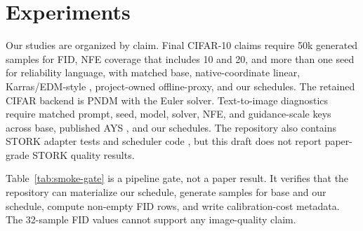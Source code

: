 \section{Experiments}
\label{sec:experiments}

Our studies are organized by claim. Final CIFAR-10 claims require
50k generated samples for FID, NFE coverage that includes 10 and 20, and more
than one seed for reliability language, with matched base, native-coordinate
linear, Karras/EDM-style \citep{karras2022edm}, project-owned offline-proxy,
and our schedules. The retained CIFAR backend is PNDM
\citep{liu2022pndm} with the Euler solver. Text-to-image diagnostics require
matched prompt, seed, model, solver, NFE, and guidance-scale keys across base,
published AYS \citep{sabour2024ays}, and our schedules. The repository
also contains STORK adapter tests and scheduler code \citep{tan2025stork}, but
this draft does not report paper-grade STORK quality results.



Table~\ref{tab:smoke-gate} is a pipeline gate, not a paper result. It verifies
that the repository can materialize our schedule, generate samples for
base and our schedule, compute non-empty FID rows, and write calibration-cost
metadata. The 32-sample FID values cannot support any image-quality claim.



